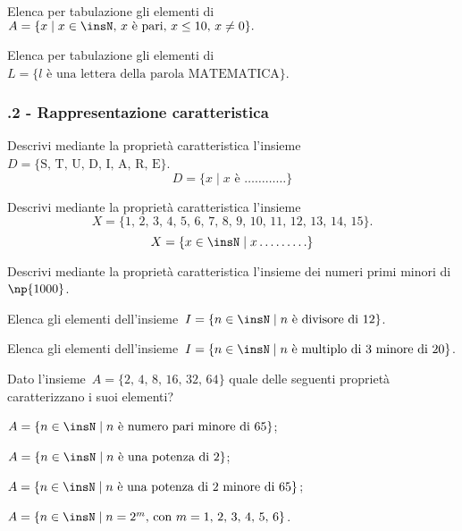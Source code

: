 \begin{esercizio}
\label{ese:6.3}
Elenca per tabulazione gli elementi di~$A=\{x\mid x\in\insN\text{, }x\text{ è pari, }x\leq10\text{, }x\neq0\}.$
\end{esercizio}

\begin{esercizio}
\label{ese:6.4}
Elenca per tabulazione gli elementi di~$L=\{l\text{ è una lettera della parola MATEMATICA}\}$.
\end{esercizio}

\subsubsection*{\thechapter.2 - Rappresentazione caratteristica}

\begin{esercizio}
\label{ese:6.5}
Descrivi mediante la proprietà caratteristica
l'insieme~$D= \{\text{S, T, U, D, I, A, R, E}\}$.
\[D=\{x\mid x\text{ è }\ldots\ldots\ldots\ldots\}\]
\end{esercizio}


\begin{esercizio}
\label{ese:6.6}
Descrivi mediante la proprietà caratteristica l'insieme
\[X=\{\text{1, 2, 3, 4, 5, 6, 7, 8, 9, 10, 11, 12, 13, 14, 15}\}.\]
\[X=\{x\in\insN\mid x\ldots\ldots\ldots\}\]
\end{esercizio}

\begin{esercizio}
\label{ese:6.7}
Descrivi mediante la proprietà caratteristica l'insieme dei numeri primi minori di~$\np{1000}$.
\end{esercizio}

\begin{esercizio}
\label{ese:6.8}
Elenca gli elementi dell'insieme~$I=\{n\in\insN\mid n\text{ è divisore di }12\}$.
\end{esercizio}

\begin{esercizio}
\label{ese:6.9}
Elenca gli elementi dell'insieme~$I=\{n\in\insN\mid n\text{ è multiplo di~3 minore di }20\}$.
\end{esercizio}
\begin{esercizio}
\label{ese:6.10}
Dato l'insieme~$A=\{\text{2, 4, 8, 16, 32, 64}\}$ quale delle seguenti proprietà caratterizzano i suoi elementi?
\begin{enumeratea}
\item $A=\{n\in\insN\mid n \text{ è numero pari minore di 65}\}$;
\item $A=\{n\in\insN\mid n\text{ è una potenza di 2}\}$;
\item $A=\{n\in\insN\mid n\text{ è una potenza di~2 minore di 65}\}$;
\item $A=\{n\in\insN\mid n=2^{m}\text{, con }m=\text{1, 2, 3, 4, 5, 6}\}$.
\end{enumeratea}
\end{esercizio}

